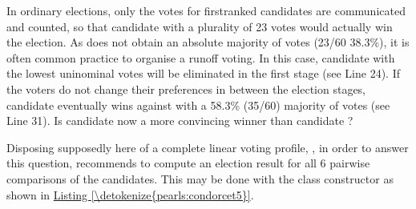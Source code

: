 \documentclass[a4paper,12pt,english]{sphinxhowto}
\begin{document}
\sphinxAtStartPar
In ordinary elections, only the votes for first\sphinxhyphen{}ranked candidates are communicated and counted, so that candidate  with a plurality of 23 votes would actually win the election. As  does not obtain an absolute majority of votes (23/60 38.3\%), it is often common practice to organise a runoff voting. In this case, candidate  with the lowest uninominal votes will be eliminated in the first stage (see Line 24). If the voters do not change their preferences in between the election stages, candidate  eventually wins against  with a  58.3\% (35/60) majority of votes (see Line 31). Is candidate  now a more convincing winner than candidate  ?

\sphinxAtStartPar
Disposing supposedly here of a complete linear voting profile, , in order to answer this question, recommends to compute an election result for all 6 pairwise comparisons of the candidates. This may be done with the  class constructor as shown in \hyperref[\detokenize{pearls:condorcet5}]{Listing \ref{\detokenize{pearls:condorcet5}}}.
\def\sphinxLiteralBlockLabel{\label{\detokenize{pearls:condorcet5}}}
%
\begin{sphinxVerbatim}[commandchars=\\\{\},numbers=left,firstnumber=1,stepnumber=1]
\PYGZbs{}
               
  
\end{sphinxVerbatim}
\sphinxresetverbatimhllines
\end{document}
